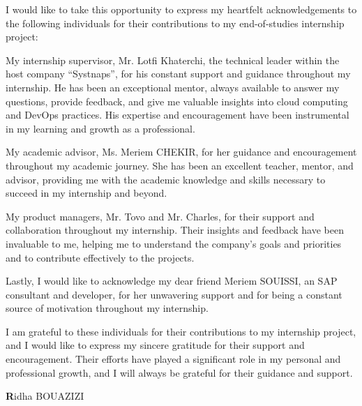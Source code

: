 \thispagestyle{empty}
\begin{center}
\end{center}
\vspace{0.8cm}        %

I would like to take this opportunity to express my heartfelt acknowledgements to the following individuals for their contributions to my end-of-studies internship project: 

My internship supervisor, Mr. Lotfi Khaterchi, the technical leader within the host company “Systnaps”, for his constant support and guidance throughout my internship. He has been an exceptional mentor, always available to answer my questions, provide feedback, and give me valuable insights into cloud computing and DevOps practices. His expertise and encouragement have been instrumental in my learning and growth as a professional. 

My academic advisor, Ms. Meriem CHEKIR, for her guidance and encouragement throughout my academic journey. She has been an excellent teacher, mentor, and advisor, providing me with the academic knowledge and skills necessary to succeed in my internship and beyond.

My product managers, Mr. Tovo and Mr. Charles, for their support and collaboration throughout my internship. Their insights and feedback have been invaluable to me, helping me to understand the company's goals and priorities and to contribute effectively to the projects.

Lastly, I would like to acknowledge my dear friend Meriem SOUISSI, an SAP consultant and developer, for her unwavering support and for being a constant source of motivation throughout my internship.

I am grateful to these individuals for their contributions to my internship project, and I would like to express my sincere gratitude for their support and encouragement. Their efforts have played a significant role in my personal and professional growth, and I will always be grateful for their guidance and support.

\begin{flushright}
\textbf Ridha BOUAZIZI
\end{flushright}

\newpage
\thispagestyle{empty}
\begin{center}
\end{center}
\vspace{0.8cm}        %

